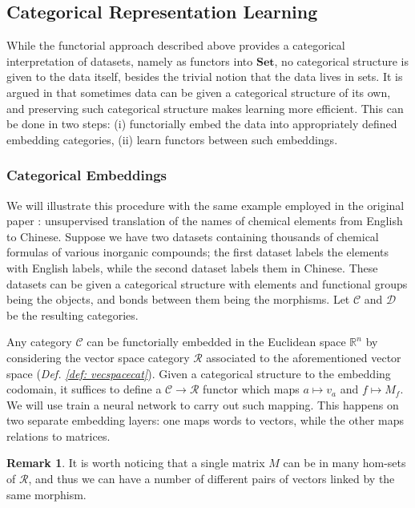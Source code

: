 \documentclass[12pt,a4paper,openright,twoside]{report}
\theoremstyle{plain}
\theoremstyle{definition}
\newtheorem{remark}[proposition]{Remark}
\begin{document}
\subsection{Categorical Representation Learning}


While the functorial approach described above provides a categorical interpretation of datasets, namely as functors into $\mathbf{Set}$, no categorical structure is given to the data itself, besides the trivial notion that the data lives in sets. It is argued in \cite{sheshmani2021categorical} that sometimes data can be given a categorical structure of its own, and preserving such categorical structure makes learning more efficient. This can be done in two steps: (i) functorially embed the data into appropriately defined embedding categories, (ii) learn functors between such embeddings. 


\subsubsection{Categorical Embeddings}

We will illustrate this procedure with the same example employed in the original paper \cite{sheshmani2021categorical}: unsupervised translation of the names of chemical elements from English to Chinese. Suppose we have two datasets containing thousands of chemical formulas of various inorganic compounds; the first dataset labels the elements with English labels, while the second dataset labels them in Chinese. These datasets can be given a categorical structure with elements and functional groups being the objects, and bonds between them being the morphisms. Let $\mathcal{C}$ and $\mathcal{D}$ be the resulting categories.


Any category $\mathcal{C}$ can be functorially embedded in the Euclidean space $\mathbb{R}^n$ by considering the vector space category $\mathcal{R}$ associated to the aforementioned vector space (\textit{Def. \ref{def: vecspacecat}}). Given a categorical structure to the embedding codomain, it suffices to define a $\mathcal{C} \to \mathcal{R}$ functor which maps $a \mapsto v_a$ and $f \mapsto M_f$. We will use train a neural network to carry out such mapping. This happens on two separate embedding layers: one maps words to vectors, while the other maps relations to matrices.  

\begin{remark}
  It is worth noticing that a single matrix $M$ can be in many hom-sets of $\mathcal{R}$, and thus we can have a number of different pairs of vectors linked by the same morphism.
\end{remark}
\end{document}
